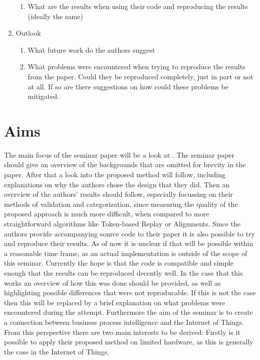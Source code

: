 \documentclass[runningheads]{template/llncs}
\begin{document}
\begin{enumerate}
\begin{enumerate}
		\item What are the results when using their code and reproducing the results (ideally the same)
	\end{enumerate}
	\item Outlook
	\begin{enumerate}
		\item What future work do the authors suggest
		\item What problems were encountered when trying to reproduce the results from the paper. Could they be reproduced completely, just in part or not at all. If so are there suggestions on how could these problems be mitigated.
	\end{enumerate}
\end{enumerate}

\section{Aims}
The main focus of the seminar paper will be a look at \cite{PBWe20}. The seminar paper should give an overview of the backgrounds that are omitted for brevity in the paper.
After that a look into the proposed method will follow, including explanations on why the authors chose the design that they did.
Then an overview of the authors' results should follow, especially focussing on their methods of validation and categorization, since measuring the quality of the proposed approach is much more difficult, when compared to more straightforward algorithms like Token-based Replay or Alignments.
Since the authors provide accompanying source code to their paper it is also possible to try and reproduce their results.
As of now it is unclear if that will be possible within a reasonable time frame, as an actual implementation is outside of the scope of this seminar.
Currently the hope is that the code is compatible and simple enough that the results can be reproduced decently well.
In the case that this works an overview of how this was done should be provided, as well as highlighting possible differences that were not reproducable.
If this is not the case then this will be replaced by a brief explanation on what problems were encountered during the attempt.
Furthermore the aim of the seminar is to create a connection between business process intelligence and the Internet of Things. From this perspective there are two main interests to be derived: Firstly is it possible to apply their proposed method on limited hardware, as this is generally the case in the Internet of Things.  %
\end{document}
